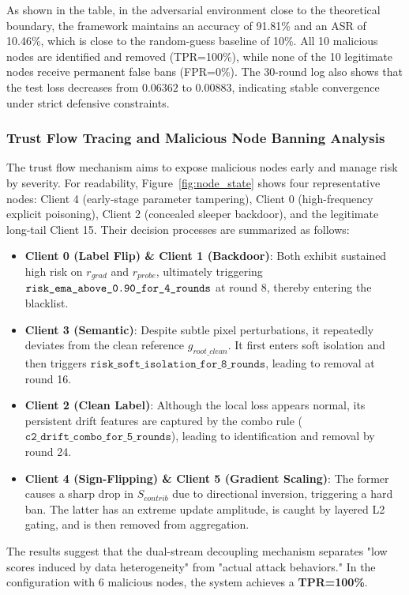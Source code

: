 \documentclass[runningheads,orivec]{llncs}
\begin{document}
As shown in the table, in the adversarial environment close to the theoretical boundary, the framework maintains an accuracy of 91.81\% and an ASR of 10.46\%, which is close to the random-guess baseline of 10\%. All 10 malicious nodes are identified and removed (TPR=100\%), while none of the 10 legitimate nodes receive permanent false bans (FPR=0\%). The 30-round log also shows that the test loss decreases from $0.06362$ to $0.00883$, indicating stable convergence under strict defensive constraints.

\subsubsection{Trust Flow Tracing and Malicious Node Banning Analysis}
The trust flow mechanism aims to expose malicious nodes early and manage risk by severity. For readability, Figure~\ref{fig:node_state} shows four representative nodes: Client 4 (early-stage parameter tampering), Client 0 (high-frequency explicit poisoning), Client 2 (concealed sleeper backdoor), and the legitimate long-tail Client 15. Their decision processes are summarized as follows:
\begin{itemize}
    \item \textbf{Client 0 (Label Flip) \& Client 1 (Backdoor)}: Both exhibit sustained high risk on $r_{grad}$ and $r_{probe}$, ultimately triggering\newline
          $\texttt{risk\_ema\_above\_0.90\_\allowbreak for\_4\_\allowbreak rounds}$ at round 8, thereby entering the blacklist.
    \item \textbf{Client 3 (Semantic)}: Despite subtle pixel perturbations, it repeatedly deviates from the clean reference $g_{root\_clean}$. It first enters soft isolation and then triggers $\texttt{risk\_soft\_isolation\_for\_8\_rounds}$, leading to removal at round 16.
    \item \textbf{Client 2 (Clean Label)}: Although the local loss appears normal, its persistent drift features are captured by the combo rule ($\texttt{c2\_drift\_combo\_for\_5\_rounds}$), leading to identification and removal by round 24.
    \item \textbf{Client 4 (Sign-Flipping) \& Client 5 (Gradient Scaling)}: The former causes a sharp drop in $S_{contrib}$ due to directional inversion, triggering a hard ban. The latter has an extreme update amplitude, is caught by layered L2 gating, and is then removed from aggregation.
\end{itemize}
The results suggest that the dual-stream decoupling mechanism separates "low scores induced by data heterogeneity" from "actual attack behaviors." In the configuration with 6 malicious nodes, the system achieves a \textbf{TPR=100\%}.
\end{document}
